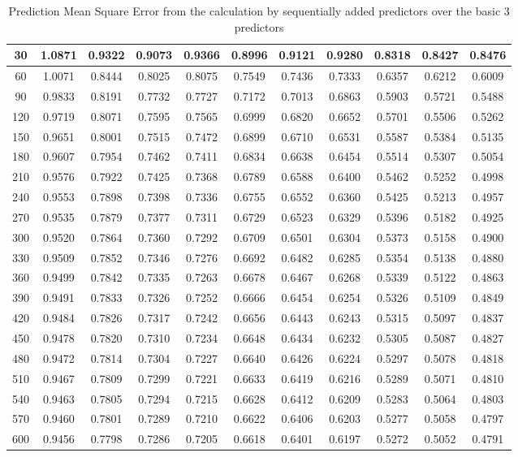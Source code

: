\begin{table}[h!]
{\begin{tabular}{||c c c c c c c c c c c||}
30 & 1.0871 & 0.9322 & 0.9073 & 0.9366 & 0.8996 & 0.9121 & 0.9280 & 0.8318 & 0.8427 & 0.8476 \\ \hline
        60 & 1.0071 & 0.8444 & 0.8025 & 0.8075 & 0.7549 & 0.7436 & 0.7333 & 0.6357 & 0.6212 & 0.6009 \\ \hline
        90 & 0.9833 & 0.8191 & 0.7732 & 0.7727 & 0.7172 & 0.7013 & 0.6863 & 0.5903 & 0.5721 & 0.5488 \\ \hline
        120 & 0.9719 & 0.8071 & 0.7595 & 0.7565 & 0.6999 & 0.6820 & 0.6652 & 0.5701 & 0.5506 & 0.5262 \\ \hline
        150 & 0.9651 & 0.8001 & 0.7515 & 0.7472 & 0.6899 & 0.6710 & 0.6531 & 0.5587 & 0.5384 & 0.5135 \\ \hline
        180 & 0.9607 & 0.7954 & 0.7462 & 0.7411 & 0.6834 & 0.6638 & 0.6454 & 0.5514 & 0.5307 & 0.5054 \\ \hline
        210 & 0.9576 & 0.7922 & 0.7425 & 0.7368 & 0.6789 & 0.6588 & 0.6400 & 0.5462 & 0.5252 & 0.4998 \\ \hline
        240 & 0.9553 & 0.7898 & 0.7398 & 0.7336 & 0.6755 & 0.6552 & 0.6360 & 0.5425 & 0.5213 & 0.4957 \\ \hline
        270 & 0.9535 & 0.7879 & 0.7377 & 0.7311 & 0.6729 & 0.6523 & 0.6329 & 0.5396 & 0.5182 & 0.4925 \\ \hline
        300 & 0.9520 & 0.7864 & 0.7360 & 0.7292 & 0.6709 & 0.6501 & 0.6304 & 0.5373 & 0.5158 & 0.4900 \\ \hline
        330 & 0.9509 & 0.7852 & 0.7346 & 0.7276 & 0.6692 & 0.6482 & 0.6285 & 0.5354 & 0.5138 & 0.4880 \\ \hline
        360 & 0.9499 & 0.7842 & 0.7335 & 0.7263 & 0.6678 & 0.6467 & 0.6268 & 0.5339 & 0.5122 & 0.4863 \\ \hline
        390 & 0.9491 & 0.7833 & 0.7326 & 0.7252 & 0.6666 & 0.6454 & 0.6254 & 0.5326 & 0.5109 & 0.4849 \\ \hline
        420 & 0.9484 & 0.7826 & 0.7317 & 0.7242 & 0.6656 & 0.6443 & 0.6243 & 0.5315 & 0.5097 & 0.4837 \\ \hline
        450 & 0.9478 & 0.7820 & 0.7310 & 0.7234 & 0.6648 & 0.6434 & 0.6232 & 0.5305 & 0.5087 & 0.4827 \\ \hline
        480 & 0.9472 & 0.7814 & 0.7304 & 0.7227 & 0.6640 & 0.6426 & 0.6224 & 0.5297 & 0.5078 & 0.4818 \\ \hline
        510 & 0.9467 & 0.7809 & 0.7299 & 0.7221 & 0.6633 & 0.6419 & 0.6216 & 0.5289 & 0.5071 & 0.4810 \\ \hline
        540 & 0.9463 & 0.7805 & 0.7294 & 0.7215 & 0.6628 & 0.6412 & 0.6209 & 0.5283 & 0.5064 & 0.4803 \\ \hline
        570 & 0.9460 & 0.7801 & 0.7289 & 0.7210 & 0.6622 & 0.6406 & 0.6203 & 0.5277 & 0.5058 & 0.4797 \\ \hline
        600 & 0.9456 & 0.7798 & 0.7286 & 0.7205 & 0.6618 & 0.6401 & 0.6197 & 0.5272 & 0.5052 & 0.4791 \\ \hline  
\hline
\end{tabular}}
\caption{Prediction Mean Square Error from the calculation by sequentially added predictors over the basic 3 predictors}
\label{table:PMSEcalcu}
\end{table}


